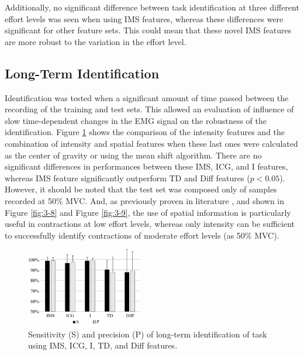 Additionally, no significant difference between task identification at three different effort levels was seen when using IMS features, whereas these differences were significant for other feature sets. This could mean that these novel IMS features are more robust to the variation in the effort level.

\subsection{Long-Term Identification}
Identification was tested when a significant amount of time passed between the recording of the training and test sets. This allowed an evaluation of influence of slow time-dependent changes in the EMG signal on the robustness of the identification. Figure \ref{fig:3-10} shows the comparison of the intensity features and the combination of intensity and spatial features when these last ones were calculated as the center of gravity or using the mean shift algorithm. There are no significant differences in performances between these IMS, ICG, and I features, whereas IMS feature significantly outperform TD and Diff features ($p < 0.05$). However, it should be noted that the test set was composed only of samples recorded at 50\% MVC. And, as previously proven in literature \citep{Jordanic2016a}, and shown in Figure \ref{fig:3-8} and Figure \ref{fig:3-9}, the use of spatial information is particularly useful in contractions at low effort levels, whereas only intensity can be sufficient to successfully identify contractions of moderate effort levels (as 50\% MVC).

\begin{figure}[ht]
\centering
\includegraphics[width=0.45\textwidth]{Images/figure3_10.png}
\caption{Sensitivity (S) and precision (P) of long-term identification of task using IMS, ICG, I, TD, and Diff features.}
\label{fig:3-10}
\end{figure}   

